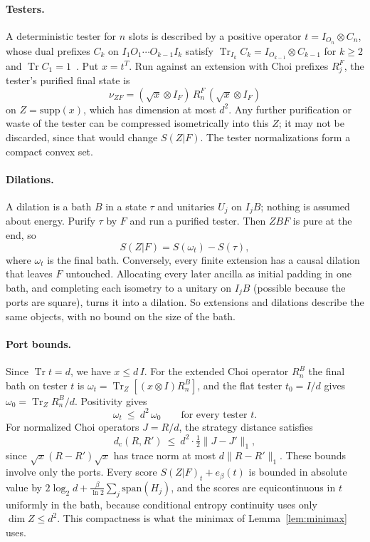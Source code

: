 \documentclass[11pt]{article}
\theoremstyle{definition}
\theoremstyle{remark}
\newcommand{\Tr}{\operatorname{Tr}}
\begin{document}
\paragraph{Testers.} A deterministic tester for $n$ slots is described by a positive operator $t=I_{O_n}\otimes C_n$, whose dual prefixes $C_k$ on $I_1O_1\cdots O_{k-1}I_k$ satisfy $\Tr_{I_k}C_k=I_{O_{k-1}}\otimes C_{k-1}$ for $k\ge2$ and $\Tr C_1=1$~\cite{Chiribella08,GutoskiWatrous07}. Put $x=t^T$. Run against an extension with Choi prefixes $R_j^F$, the tester's purified final state is
\begin{equation}\label{eq:testerstate}
\nu_{ZF}=(\sqrt x\otimes I_F)\,R_n^F\,(\sqrt x\otimes I_F)
\end{equation}
on $Z=\mathrm{supp}(x)$, which has dimension at most $d^2$. Any further purification or waste of the tester can be compressed isometrically into this $Z$; it may not be discarded, since that would change $S(Z|F)$. The tester normalizations form a compact convex set.

\paragraph{Dilations.} A dilation is a bath $B$ in a state $\tau$ and unitaries $U_j$ on $I_jB$; nothing is assumed about energy. Purify $\tau$ by $F$ and run a purified tester. Then $ZBF$ is pure at the end, so
\[
S(Z|F)=S(\omega_t)-S(\tau),
\]
where $\omega_t$ is the final bath. Conversely, every finite extension has a causal dilation that leaves $F$ untouched. Allocating every later ancilla as initial padding in one bath, and completing each isometry to a unitary on $I_jB$ (possible because the ports are square), turns it into a dilation. So extensions and dilations describe the same objects, with no bound on the size of the bath.

\paragraph{Port bounds.} Since $\Tr t=d$, we have $x\le d\,I$. For the extended Choi operator $R_n^B$ the final bath on tester $t$ is $\omega_t=\Tr_Z[(x\otimes I)R_n^B]$, and the flat tester $t_0=I/d$ gives $\omega_0=\Tr_ZR_n^B/d$. Positivity gives
\begin{equation}\label{eq:domination}
\omega_t\ \le\ d^2\,\omega_0\qquad\text{for every tester }t.
\end{equation}
For normalized Choi operators $J=R/d$, the strategy distance satisfies
\begin{equation}\label{eq:choidistance}
d_{\mathrm c}(R,R')\ \le\ d^2\cdot\tfrac12\|J-J'\|_1,
\end{equation}
since $\sqrt x(R-R')\sqrt x$ has trace norm at most $d\|R-R'\|_1$. These bounds involve only the ports. Every score $S(Z|F)_t+e_\beta(t)$ is bounded in absolute value by $2\log_2d+\frac{\beta}{\ln2}\sum_j\mathrm{span}(H_j)$, and the scores are equicontinuous in $t$ uniformly in the bath, because conditional entropy continuity uses only $\dim Z\le d^2$. This compactness is what the minimax of Lemma~\ref{lem:minimax} uses.
\end{document}
